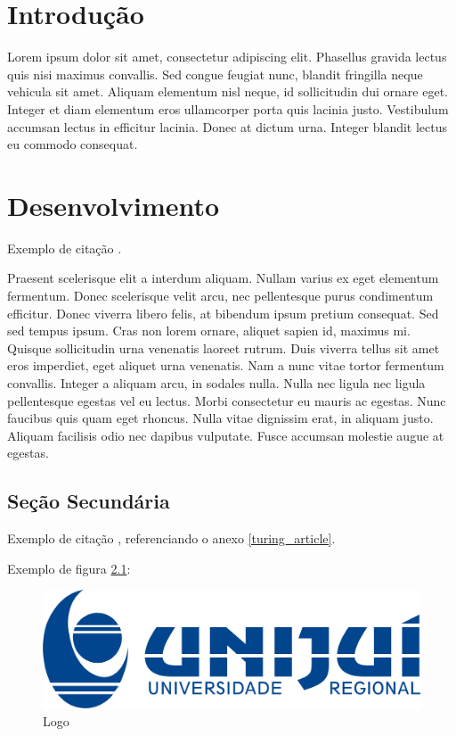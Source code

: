\documentclass[
	12pt,				%
	openright,			%
	oneside,			%
	a4paper,			%
	chapter=TITLE,		%
	english,			%
	brazil,				%
	]{abntex2}
\begin{document}
\tableofcontents*
\cleardoublepage


\textual

\chapter{Introdução}

Lorem ipsum dolor sit amet, consectetur adipiscing elit. Phasellus gravida lectus quis nisi maximus convallis. Sed congue feugiat nunc, blandit fringilla neque vehicula sit amet. Aliquam elementum nisl neque, id sollicitudin dui ornare eget. Integer et diam elementum eros ullamcorper porta quis lacinia justo. Vestibulum accumsan lectus in efficitur lacinia. Donec at dictum urna. Integer blandit lectus eu commodo consequat.

\chapter{Desenvolvimento}

Exemplo de citação \cite{einstein}.

Praesent scelerisque elit a interdum aliquam. Nullam varius ex eget elementum fermentum. Donec scelerisque velit arcu, nec pellentesque purus condimentum efficitur. Donec viverra libero felis, at bibendum ipsum pretium consequat. Sed sed tempus ipsum. Cras non lorem ornare, aliquet sapien id, maximus mi. Quisque sollicitudin urna venenatis laoreet rutrum. Duis viverra tellus sit amet eros imperdiet, eget aliquet urna venenatis. Nam a nunc vitae tortor fermentum convallis. Integer a aliquam arcu, in sodales nulla. Nulla nec ligula nec ligula pellentesque egestas vel eu lectus. Morbi consectetur eu mauris ac egestas. Nunc faucibus quis quam eget rhoncus. Nulla vitae dignissim erat, in aliquam justo. Aliquam facilisis odio nec dapibus vulputate. Fusce accumsan molestie augue at egestas.

\section{Seção Secundária}

Exemplo de citação \cite{turing}, referenciando o anexo \ref{turing_article}.

Exemplo de figura \ref{logo_unijui}:

\begin{figure}[h!]
	\centering
	\caption{\label{logo_unijui}Logo}
	\includegraphics[scale=0.8]{imagens/logo-unijui-horizontal.png}
\end{figure}
\FloatBarrier	
\end{document}
